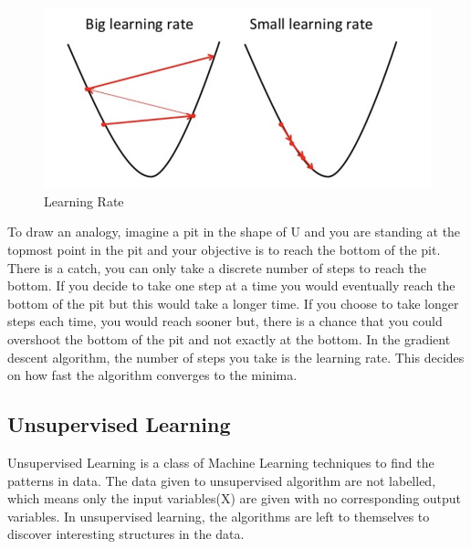 \begin{itemize}
                \begin{figure}[htbp]
                    \centering
	                \includegraphics[scale=0.4]{Figures/lrate.png}
		            \caption[Learning Rate]{Learning Rate}
	                \label{fig:Learning Rate}
                \end{figure}
        To draw an analogy, imagine a pit in the shape of U and you are standing at the topmost point in the pit and your objective is to reach the bottom of the pit. There is a catch, you can only take a discrete number of steps to reach the bottom. If you decide to take one step at a time you would eventually reach the bottom of the pit but this would take a longer time. If you choose to take longer steps each time, you would reach sooner but, there is a chance that you could overshoot the bottom of the pit and not exactly at the bottom. In the gradient descent algorithm, the number of steps you take is the learning rate. This decides on how fast the algorithm converges to the minima.
    
\end{itemize}
\subsection{Unsupervised Learning}
    Unsupervised Learning is a class of Machine Learning techniques to find the patterns in data. The data given to unsupervised algorithm are not labelled, which means only the input variables(X) are given with no corresponding output variables. In unsupervised learning, the algorithms are left to themselves to discover interesting structures in the data.